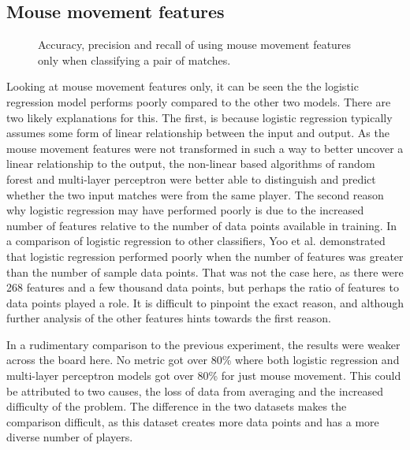 \documentclass[Report.tex]{subfiles}
\newcommand{\baraxis}[8]{
\begin{axis}[
    ybar,
    title={#1},
    width=#5,
    height=#6,
    ymin=#3, ymax=#4,
    bar width=1em,
    legend style={at={#7},anchor=north,legend columns=-1},
    enlarge x limits=0.4,
    x tick label style={align=center,text width=#8},
    symbolic x coords={Logistic Regression, Random Forest, Multi-layer Perceptron},
    xtick=data,
    ylabel={#2}
]
}
\newcommand{\plotbar}[5]{
\addplot+[
	discard if not={numSplits}{#1},
	discard if not={split}{#2},
	discard if not={features}{#3},
] table [x=model, y=#4,col sep=comma] {data/19-pair-cv.csv};
\addlegendentry{#5}
}
\begin{document}

\subsection{Mouse movement features}

\begin{figure}[H]
\centering
{}
\caption{Accuracy, precision and recall of using mouse movement features only when classifying a pair of matches.}
\end{figure}

Looking at mouse movement features only, it can be seen the the logistic regression model performs poorly compared to the other two models. There are two likely explanations for this. The first, is because logistic regression typically assumes some form of linear relationship between the input and output. As the mouse movement features were not transformed in such a way to better uncover a linear relationship to the output, the non-linear based algorithms of random forest and multi-layer perceptron were better able to distinguish and predict whether the two input matches were from the same player. The second reason why logistic regression may have performed poorly is due to the increased number of features relative to the number of data points available in training. In a comparison of logistic regression to other classifiers, Yoo et al. \cite{lr-vs-rf} demonstrated that logistic regression performed poorly when the number of features was greater than the number of sample data points. That was not the case here, as there were 268 features and a few thousand data points, but perhaps the ratio of features to data points played a role. It is difficult to pinpoint the exact reason, and although further analysis of the other features hints towards the first reason.

In a rudimentary comparison to the previous experiment, the results were weaker across the board here. No metric got over 80\% where both logistic regression and multi-layer perceptron models got over 80\% for just mouse movement. This could be attributed to two causes, the loss of data from averaging and the increased difficulty of the problem. The difference in the two datasets makes the comparison difficult, as this dataset creates more data points and has a more diverse number of players. 
\end{document}
